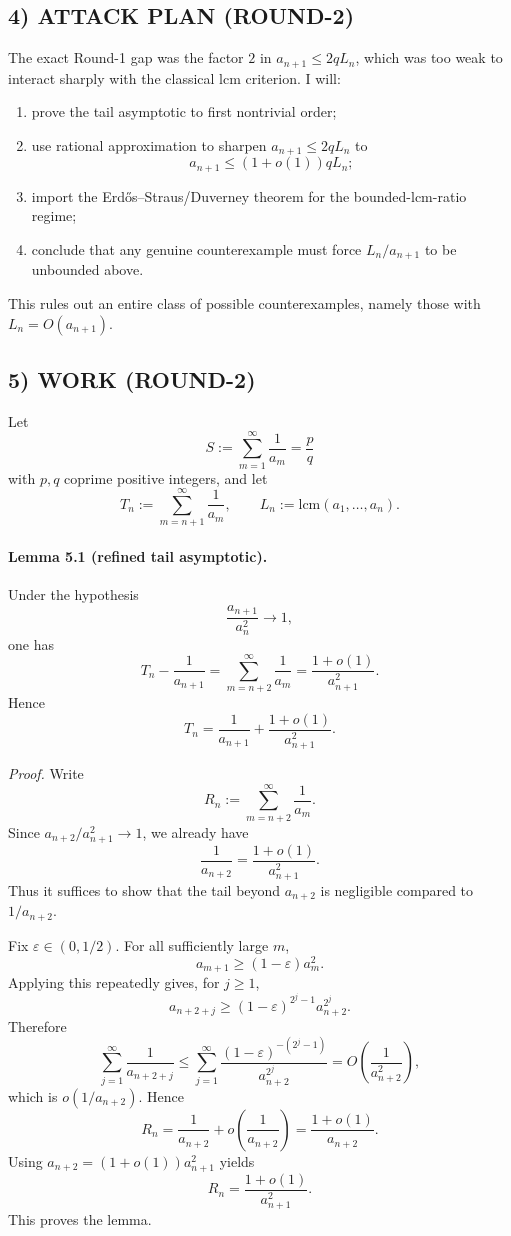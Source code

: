\subsection*{4) ATTACK PLAN (ROUND-2)}
The exact Round-1 gap was the factor $2$ in $a_{n+1}\le 2qL_n$, which was too weak to interact sharply with the classical lcm criterion. I will:
\begin{enumerate}
\item prove the tail asymptotic to first nontrivial order;
\item use rational approximation to sharpen $a_{n+1}\le 2qL_n$ to
\[
 a_{n+1}\le (1+o(1))qL_n;
\]
\item import the Erd\H{o}s--Straus/\allowbreak Duverney theorem for the bounded-lcm-ratio regime;
\item conclude that any genuine counterexample must force $L_n/a_{n+1}$ to be unbounded above.
\end{enumerate}
This rules out an entire class of possible counterexamples, namely those with $L_n=O(a_{n+1})$.

\subsection*{5) WORK (ROUND-2)}
Let
\[
 S:=\sum_{m=1}^{\infty}\frac{1}{a_m}=\frac{p}{q}
\]
with $p,q$ coprime positive integers, and let
\[
 T_n:=\sum_{m=n+1}^{\infty}\frac{1}{a_m},
\qquad L_n:=\mathrm{lcm}(a_1,\dots,a_n).
\]

\paragraph{Lemma 5.1 (refined tail asymptotic).}
Under the hypothesis
\[
 \frac{a_{n+1}}{a_n^2}\to 1,
\]
one has
\[
 T_n-\frac{1}{a_{n+1}}=\sum_{m=n+2}^{\infty}\frac{1}{a_m}=\frac{1+o(1)}{a_{n+1}^2}.
\]
Hence
\[
 T_n=\frac{1}{a_{n+1}}+\frac{1+o(1)}{a_{n+1}^2}.
\]

\emph{Proof.}
Write
\[
 R_n:=\sum_{m=n+2}^{\infty}\frac{1}{a_m}.
\]
Since $a_{n+2}/a_{n+1}^2\to 1$, we already have
\[
 \frac{1}{a_{n+2}}=\frac{1+o(1)}{a_{n+1}^2}.
\]
Thus it suffices to show that the tail beyond $a_{n+2}$ is negligible compared to $1/a_{n+2}$.

Fix $\varepsilon\in(0,1/2)$. For all sufficiently large $m$,
\[
 a_{m+1}\ge (1-\varepsilon)a_m^2.
\]
Applying this repeatedly gives, for $j\ge 1$,
\[
 a_{n+2+j}\ge (1-\varepsilon)^{2^j-1}a_{n+2}^{2^j}.
\]
Therefore
\[
 \sum_{j=1}^{\infty}\frac{1}{a_{n+2+j}}
 \le \sum_{j=1}^{\infty}\frac{(1-\varepsilon)^{-(2^j-1)}}{a_{n+2}^{2^j}}
 =O\!\left(\frac{1}{a_{n+2}^2}\right),
\]
which is $o(1/a_{n+2})$. Hence
\[
 R_n=\frac{1}{a_{n+2}}+o\!\left(\frac{1}{a_{n+2}}\right)=\frac{1+o(1)}{a_{n+2}}.
\]
Using $a_{n+2}=(1+o(1))a_{n+1}^2$ yields
\[
 R_n=\frac{1+o(1)}{a_{n+1}^2}.
\]
This proves the lemma.

